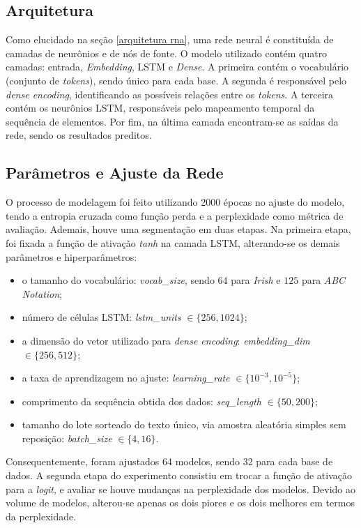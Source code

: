 \documentclass[twoside]{automatextcc}
\begin{document}
\subsection{Arquitetura}
Como elucidado na seção \ref{arquitetura rna}, uma rede neural é constituída de camadas de neurônios e de nós de fonte. O modelo utilizado contém quatro camadas: entrada, \textit{Embedding}, LSTM e \textit{Dense}. A primeira contém o vocabulário (conjunto de \textit{tokens}), sendo único para cada base. A segunda é responsável pelo \textit{dense encoding}, identificando as possíveis relações entre os \textit{tokens}. A terceira contém os neurônios LSTM, responsáveis pelo mapeamento temporal da sequência de elementos. Por fim, na última camada encontram-se as saídas da rede, sendo os resultados preditos.



\subsection{Parâmetros e Ajuste da Rede}
O processo de modelagem foi feito utilizando 2000 épocas no ajuste do modelo, tendo a entropia cruzada como função perda e a perplexidade como métrica de avaliação. Ademais, houve uma segmentação em duas etapas. Na primeira etapa, foi fixada a função de ativação \textit{tanh} na camada LSTM, alterando-se os demais parâmetros e hiperparâmetros: 
\begin{itemize}
    \item o tamanho do vocabulário: \textit{vocab\_size}, sendo $64$ para \textit{Irish} e $125$ para \textit{ABC Notation};
    \item número de células LSTM: \textit{lstm\_units} $\in \{256,1024\}$;
    \item a dimensão do vetor utilizado para \textit{dense encoding}: \textit{embedding\_dim} $\in \{256,512\}$;
    \item a taxa de aprendizagem no ajuste: \textit{learning\_rate} $\in \{10^{-3},10^{-5}\}$;
    \item comprimento da sequência obtida dos dados: \textit{seq\_length} $\in \{50,200\}$;
    \item tamanho do lote sorteado do texto único, via amostra aleatória simples sem reposição: \textit{batch\_size} $\in \{4,16\}$.
\end{itemize}
Consequentemente, foram ajustados 64 modelos, sendo 32 para cada base de dados. A segunda etapa do experimento consistiu em trocar a função de ativação para a \textit{logit}, e avaliar se houve mudanças na perplexidade dos modelos. Devido ao volume de modelos, alterou-se apenas os dois piores e os dois melhores em termos da perplexidade.
\end{document}
